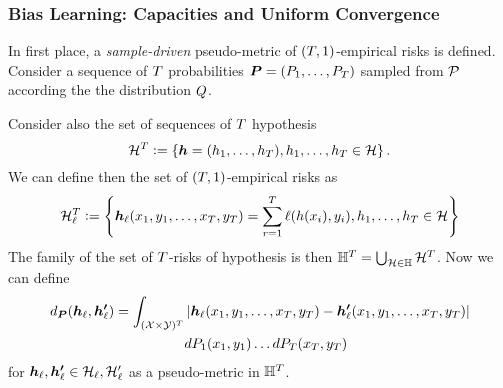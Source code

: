 \subsubsection*{Bias Learning: Capacities and Uniform Convergence}
In first place, a \emph{sample-driven} pseudo-metric of $(T, 1)$-empirical risks is defined.
Consider a sequence of $T$ probabilities $\bm{P} = (P_1, \ldots, P_T)$ sampled from $\mathcal{P}$ according the the distribution $Q$. 
\begin{definition}
    \label{def:sample_pseudometric}
    Consider also the set of sequences of $T$ hypothesis 
$$\mathcal{H}^T \vcentcolon= \left\{ \bm{h} = (h_1, \ldots, h_T) , h_1, \ldots, h_T \in \mathcal{H}\right\} .$$
We can define then the set of $(T, 1)$-empirical risks as 
$$\mathcal{H}^T_\ell \vcentcolon= \left\{ \bm{h}_\ell(x_1, y_1, \ldots, x_T, y_T) = \sum_{r=1}^T \ell(h(x_i), y_i) , h_1, \ldots, h_T \in \mathcal{H}\right\} $$
The family of the set of $T$-risks of hypothesis is then $\mathbb{H}^{T} = \bigcup_{\mathcal{H} \in \mathbb{H}} \mathcal{H}^T$. Now we can define
\begin{equation}
    \nonumber
    \begin{aligned}
        d_{\bm{P}}(\bm{h}_\ell, \bm{h'}_\ell) = \int_{(\mathcal{X} \times \mathcal{Y})^{T}} &\left|\bm{h}_\ell(x_1, y_1, \ldots, x_T, y_T) - \bm{h'}_\ell(x_1, y_1, \ldots, x_T, y_T)\right| \\ 
        & d{P_1}(x_1, y_1) \ldots d{P_T}(x_T, y_T)
    \end{aligned}
\end{equation}
for $\bm{h}_\ell, \bm{h'}_\ell \in \mathcal{H}_\ell, \mathcal{H}'_\ell$ as a pseudo-metric in $\mathbb{H}^T$.
\end{definition}
%

